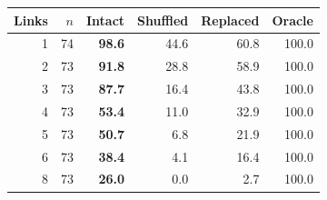 \begin{tabular}{@{}rrrrrr@{}}
\toprule
Links & $n$ & Intact & Shuffled & Replaced & Oracle \\
\midrule
1 & 74 & \textbf{98.6} & 44.6 & 60.8 & 100.0 \\
2 & 73 & \textbf{91.8} & 28.8 & 58.9 & 100.0 \\
3 & 73 & \textbf{87.7} & 16.4 & 43.8 & 100.0 \\
4 & 73 & \textbf{53.4} & 11.0 & 32.9 & 100.0 \\
5 & 73 & \textbf{50.7} & 6.8 & 21.9 & 100.0 \\
6 & 73 & \textbf{38.4} & 4.1 & 16.4 & 100.0 \\
8 & 73 & \textbf{26.0} & 0.0 & 2.7 & 100.0 \\
\bottomrule
\end{tabular}
